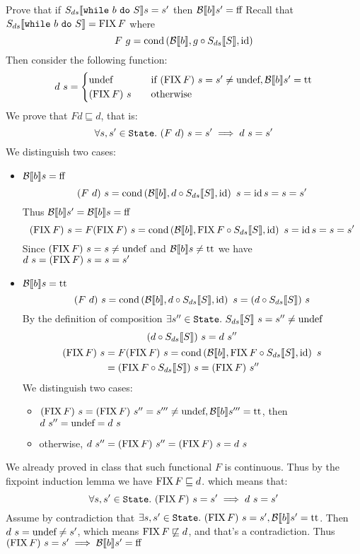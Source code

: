 \begin{exercise}{
    Prove that if $\Sds{\wwhile{b}{S}} s = s'$ then $\Bool{b} s' = \False$
}
    Recall that $\Sds{\wwhile{b}{S}} = \FIX F$ where
    \[ F\ g= \cond{\Bool{b}}{g \circ \Sds{S}}{\id} \]
    Then consider the following function:
    \[
        d\ s = \begin{cases}
            \undef &\quad \text{if } (\FIX F)\ s = s' \neq \undef, \Bool{b} s' = \True \\
            (\FIX F)\ s &\quad \text{otherwise}
        \end{cases}
    \]
    We prove that $F d \sqsubseteq d$, that is:
    \[ \forall s, s' \in \State.\ (F\ d)\ s = s' \implies d\ s = s' \]
    We distinguish two cases:
    \begin{itemize}
        \item $\Bool{b} s = \False$
            \[ (F\ d)\ s = \cond{\Bool{b}}{d \circ \Sds{S}}{\id}\ s = \id s = s = s' \]
            Thus $\Bool{b} s' = \Bool{b} s = \False$
            \[ (\FIX F)\ s = F(\FIX F)\ s = \cond{\Bool{b}}{\FIX F \circ \Sds{S}}{\id}\ s = \id s = s = s' \]
            Since $(\FIX F)\ s = s \neq \undef$ and $\Bool{b} s \neq \True$ we have $d\ s = (\FIX F)\ s = s = s'$
        \item $\Bool{b} s = \True$
            \[ (F\ d)\ s = \cond{\Bool{b}}{d \circ \Sds{S}}{\id}\ s = (d \circ \Sds{S})\ s \]
            By the definition of composition $\exists s'' \in \State.\ \Sds{S}\ s = s'' \neq \undef$
            \begin{gather*}
                (d \circ \Sds{S})\ s = d\ s'' \\
                \begin{aligned}
                    (\FIX F)\ s &= F(\FIX F)\ s = \cond{\Bool{b}}{\FIX F \circ \Sds{S}}{\id}\ s \\
                    &= (\FIX F \circ \Sds{S})\ s = (\FIX F)\ s''
                \end{aligned}
            \end{gather*}
            We distinguish two cases:
            \begin{itemize}
                \item $(\FIX F)\ s = (\FIX F)\ s'' = s''' \neq \undef, \Bool{b} s''' = \True$, then $d\ s'' = \undef = d\ s$
                \item otherwise, $d\ s'' = (\FIX F)\ s'' = (\FIX F)\ s = d\ s$
            \end{itemize}
    \end{itemize}
    We already proved in class that such functional $F$ is continuous.
    Thus by the fixpoint induction lemma we have $\FIX F \sqsubseteq d$. which means that:
    \[ \forall s, s' \in \State.\ (\FIX F)\ s = s' \implies d\ s = s' \]
    Assume by contradiction that $\exists s, s' \in \State.\ (\FIX F)\ s = s', \Bool{b} s' = \True $. Then $d\ s = \undef \neq s'$, which means $\FIX F \not\sqsubseteq d$, and that's a contradiction. Thus $(\FIX F)\ s = s' \implies \Bool{b} s' = \False$
\end{exercise}
